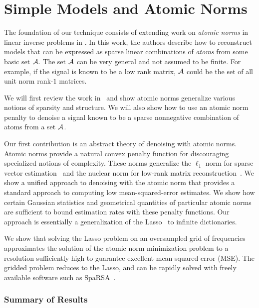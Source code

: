 \chapter{Simple Models and Atomic Norms}
\label{chap:ast}

The foundation of our technique consists of extending work on \emph{atomic
norms} in linear inverse problems in \cite{crpw}. In this work, the authors
describe how to reconstruct models that can be expressed as sparse linear
combinations of \emph{atoms} from some basic set $\mathcal{A}.$ The set $\mathcal{A}$ can be very
general and not assumed to be finite. For example, if the signal is known to be
a low rank matrix, $\mathcal{A}$ could be the set of all unit norm rank-$1$ matrices.

We will first review the work in~\cite{crpw} and show atomic norms generalize
various notions of sparsity and structure.  We will also show how to use an
atomic norm penalty to denoise a signal known to be a sparse nonnegative
combination of atoms from a set $\mathcal{A}$.

Our first contribution is an abstract theory of denoising with atomic norms.
Atomic norms provide a natural convex penalty function for discouraging
specialized notions of complexity. These norms generalize the $\ell_1$ norm
for sparse vector estimation~\cite{candes06} and the nuclear norm for low-rank
matrix reconstruction~\cite{Recht10,CandesRecht09}. We show a unified approach
to denoising with the atomic norm that provides a standard approach to
computing low mean-squared-error estimates. We show how certain Gaussian
statistics and geometrical quantities of particular atomic norms are
sufficient to bound estimation rates with these penalty functions. Our
approach is essentially a generalization of the
Lasso~\cite{tibshirani96,chen98} to infinite dictionaries.

We show that solving the Lasso problem on an oversampled grid of frequencies
approximates the solution of the atomic norm minimization problem to a
resolution sufficiently high to guarantee excellent mean-squared error (MSE).
The gridded problem reduces to the Lasso, and can be rapidly solved with freely
available software such as SpaRSA~\cite{wright09}.

\subsection{Summary of Results}


